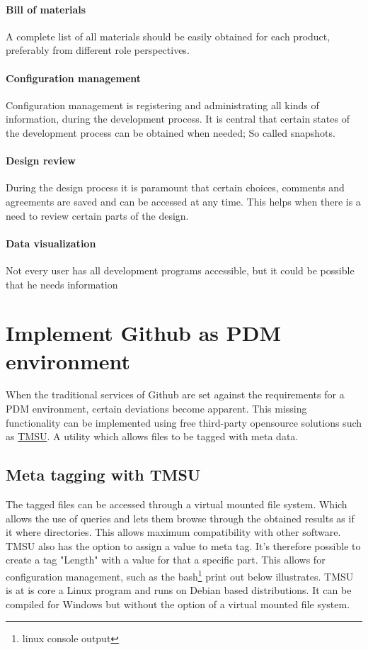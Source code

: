 \documentclass[fleqn,10pt]{SelfArx} %
\begin{document}
\paragraph{Bill of materials}
A complete list of all materials should be easily obtained for each product, preferably from different role perspectives.

\paragraph{Configuration management}
Configuration management is registering and administrating all kinds of information, during the development process. It is central that certain states of the development process can be obtained when needed; So called snapshots.

\paragraph{Design review}
During the design process it is paramount that certain choices, comments and agreements are saved and can be accessed at any time. This helps when there is a need to review certain parts of the design.

\paragraph{Data visualization}
Not every user has all development programs accessible, but it could be possible that he needs information 
 
\section{Implement Github as PDM environment}\label{sec:github as PDM}
When the traditional services of Github are set against the requirements for a PDM environment, certain deviations become apparent. This missing functionality can be implemented using free third-party opensource solutions such as \href{http://tmsu.org/}{\color{color1}TMSU}. A utility which allows files to be tagged with meta data.

\subsection{Meta tagging with TMSU}
The tagged files can be accessed through a virtual mounted file system. Which allows the use of queries and lets them browse through the obtained results as if it where directories. This allows maximum compatibility with other software. TMSU also has the option to assign a value to meta tag. It's therefore possible to create a tag "Length" with a value for that a specific part. This allows for configuration management, such as the bash\footnote{linux console output} print out below illustrates. TMSU is at is core a Linux program and runs on Debian based distributions. It can be compiled for Windows but without the option of a virtual mounted file system.
\end{document}
